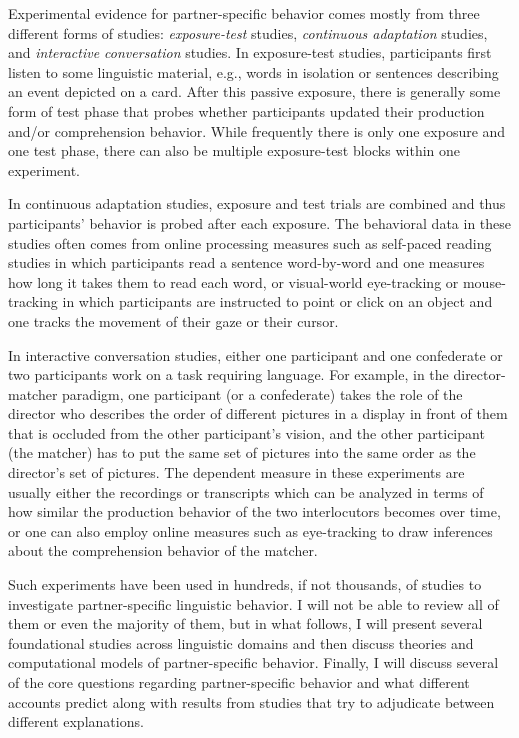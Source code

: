Experimental evidence for partner-specific behavior comes mostly from three different forms of studies: \textit{exposure-test} studies, \textit{continuous adaptation} studies, and \textit{interactive conversation} studies.
In exposure-test studies, participants first listen to some linguistic material,  e.g., words in isolation or sentences describing an event depicted on a card.  After this passive exposure, there is generally
some form of test phase that probes whether participants updated their production and/or comprehension behavior. While frequently there is only one exposure and one test phase, there can also be multiple
exposure-test blocks within one experiment.

In continuous adaptation studies, exposure and test trials are combined and thus participants' behavior is probed after each exposure. The behavioral data in these studies often comes from online processing measures such as self-paced reading studies in which participants read a sentence word-by-word and one measures how long it takes them to read each word, or visual-world eye-tracking \cite{Tanenhaus1995} or mouse-tracking  in which participants are instructed to point or click on an object and one tracks the movement of their gaze or their cursor.

In interactive conversation studies, either one participant and one confederate or two participants work on a task requiring language. For example, in the director-matcher paradigm, one participant (or a confederate) takes the role of the director who describes the order of different pictures in a display in front of them that is occluded from the other participant's vision, and the other participant (the matcher) has to put the same set of pictures into the same order 
as the director's set of pictures. The dependent measure in these experiments are usually either the recordings or transcripts which can be analyzed in terms of how similar the production behavior of the two interlocutors becomes over time, or one can also employ online measures such as eye-tracking to draw inferences about the comprehension behavior of the matcher.

Such experiments have been used in hundreds, if not thousands, of studies to investigate partner-specific linguistic behavior. I will not be able to review all of them or even the majority of them, but in what follows, I will present several foundational studies across linguistic domains and then discuss theories and computational models of partner-specific behavior. Finally, I will discuss several of the core questions regarding partner-specific behavior and what different accounts predict along with results from studies that try to adjudicate between different explanations. 

